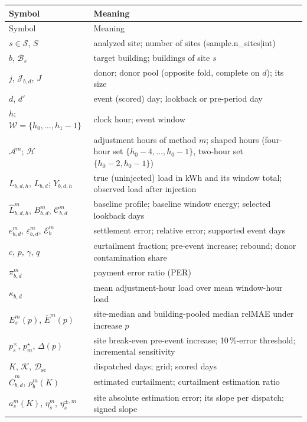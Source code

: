 \begin{longtable}{@{}>{\raggedright\arraybackslash}p{}>{\raggedright\arraybackslash}p{}@{}}
\toprule
Symbol & Meaning \\
\midrule
\endfirsthead
\toprule
Symbol & Meaning \\
\midrule
\endhead
\bottomrule
\endfoot
$s\in\mathcal{S}$, $S$ & analyzed site; number of sites ({{sample.n_sites|int}}) \\
$b$, $\mathcal{B}_s$ & target building; buildings of site $s$ \\
$j$, $\mathcal{J}_{b,d}$, $J$ & donor; donor pool (opposite fold, complete on $d$); its size \\
$d$, $d'$ & event (scored) day; lookback or pre-period day \\
$h$; $\mathcal{W}=\{h_0,\dots,h_1-1\}$ & clock hour; event window \\
$\mathcal{A}^m$; $\mathcal{H}$ & adjustment hours of method $m$; shaped hours (four-hour set $\{h_0-4,\dots,h_0-1\}$, two-hour set $\{h_0-2,h_0-1\}$) \\
$L_{b,d,h}$, $L_{b,d}$; $Y_{b,d,h}$ & true (uninjected) load in kWh and its window total; observed load after injection \\
$\hat{L}^m_{b,d,h}$, $B^m_{b,d}$, $\mathcal{C}^m_{b,d}$ & baseline profile; baseline window energy; selected lookback days \\
$e^m_{b,d}$, $\varepsilon^m_{b,d}$, $\mathcal{E}^m_b$ & settlement error; relative error; supported event days \\
$c$, $p$, $\gamma$, $q$ & curtailment fraction; pre-event increase; rebound; donor contamination share \\
$\pi^m_{b,d}$ & payment error ratio (PER) \\
$\kappa_{b,d}$ & mean adjustment-hour load over mean window-hour load \\
$E^m_s(p)$, $\bar{E}^m(p)$ & site-median and building-pooled median relMAE under increase $p$ \\
$p^{\times}_s$, $p^{\star}_m$, $\Delta(p)$ & site break-even pre-event increase; 10\,\%-error threshold; incremental sensitivity \\
$K$, $\mathcal{K}$, $\mathcal{D}_{\mathrm{sc}}$ & dispatched days; grid; scored days \\
$\hat{C}^m_{b,d}$, $\rho^m_b(K)$ & estimated curtailment; curtailment estimation ratio \\
$a^m_s(K)$, $\eta^m_s$, $\eta^{\pm,m}_s$ & site absolute estimation error; its slope per dispatch; signed slope \\

\end{longtable}

